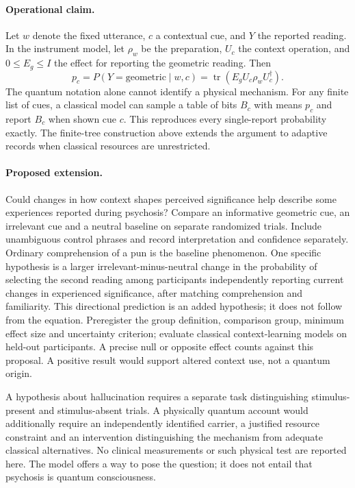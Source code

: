 \documentclass[11pt,a4paper]{article}
\theoremstyle{definition}
\newcommand{\tr}{\operatorname{tr}}
\begin{document}
\paragraph{Operational claim.} Let $w$ denote the fixed utterance, $c$ a contextual cue, and $Y$ the reported reading. In the instrument model, let $\rho_w$ be the preparation, $U_c$ the context operation, and $0\le E_g\le I$ the effect for reporting the geometric reading. Then
\[
 p_c=P(Y=\mathrm{geometric}\mid w,c)=\tr(E_g U_c\rho_w U_c^\dagger).
\]
The quantum notation alone cannot identify a physical mechanism. For any finite list of cues, a classical model can sample a table of bits $B_c$ with means $p_c$ and report $B_c$ when shown cue $c$. This reproduces every single-report probability exactly. The finite-tree construction above extends the argument to adaptive records when classical resources are unrestricted.

\paragraph{Proposed extension.} Could changes in how context shapes perceived significance help describe some experiences reported during psychosis? Compare an informative geometric cue, an irrelevant cue and a neutral baseline on separate randomized trials. Include unambiguous control phrases and record interpretation and confidence separately. Ordinary comprehension of a pun is the baseline phenomenon. One specific hypothesis is a larger irrelevant-minus-neutral change in the probability of selecting the second reading among participants independently reporting current changes in experienced significance, after matching comprehension and familiarity. This directional prediction is an added hypothesis; it does not follow from the equation. Preregister the group definition, comparison group, minimum effect size and uncertainty criterion; evaluate classical context-learning models on held-out participants. A precise null or opposite effect counts against this proposal. A positive result would support altered context use, not a quantum origin.

A hypothesis about hallucination requires a separate task distinguishing stimulus-present and stimulus-absent trials. A physically quantum account would additionally require an independently identified carrier, a justified resource constraint and an intervention distinguishing the mechanism from adequate classical alternatives. No clinical measurements or such physical test are reported here. The model offers a way to pose the question; it does not entail that psychosis is quantum consciousness.
\end{document}
